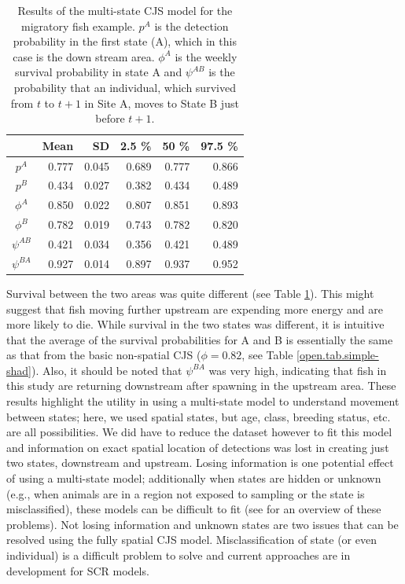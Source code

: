 \begin{table}
\centering
\caption{
  Results of the multi-state CJS model for the migratory fish example.  $p^A$ is the detection probability in the first state (A), which in this case is the down stream area.  $\phi^A$ is the weekly survival probability in state A and $\psi^{AB}$ is the probability that an individual, which survived from $t$ to $t+1$ in Site A, moves to State B just
  before $t+1$.
}
\begin{tabular}{crrrrr}
\hline \hline
&       Mean   &  SD  &  2.5 \%   &   50 \%    &  97.5 \%  \\  \hline
$p^A$ & 0.777 & 0.045 & 0.689  & 0.777  & 0.866 \\
$p^B$  & 0.434  & 0.027 & 0.382 & 0.434  & 0.489 \\
$\phi^A$  & 0.850 & 0.022 & 0.807  & 0.851  & 0.893  \\
$\phi^B$  & 0.782  & 0.019 & 0.743  & 0.782& 0.820  \\
$\psi^{AB}$ & 0.421 & 0.034 & 0.356  & 0.421 &  0.489 \\
$\psi^{BA}$& 0.927 & 0.014 & 0.897  & 0.937 &  0.952  \\
\hline
\end{tabular}
\label{open.tab.multi-shad}
\end{table}

Survival between the two areas was quite different (see Table
\ref{open.tab.multi-shad}).  This might suggest that fish moving
further upstream are expending more energy and are more likely to die.
While survival in the two states was different, it is intuitive that
the average of the survival probabilities for A and B is essentially
the same as that from the basic non-spatial CJS ($\phi = 0.82$, see
Table \ref{open.tab.simple-shad}).  Also, it should be noted that
$\psi^{BA}$ was very high, indicating that fish in this study are
returning downstream after spawning in the upstream area.  These
results highlight the utility in using a multi-state model to
understand movement between states; here, we used spatial states, but
age, class, breeding status, etc. are all possibilities.  We did have
to reduce the  
dataset however to fit this model and information on exact spatial location of detections
was lost in creating just two states, downstream and upstream.  Losing
information is one potential effect of using a multi-state model;
additionally when states are hidden or unknown (e.g., when animals are
in a region not exposed to sampling or the state is misclassified),
these models can be difficult to fit (see \citet{conn_cooch:2009} for
an overview of these problems).  Not losing information and unknown
states are two issues that can be resolved using the fully spatial CJS
model.  Misclassification of state (or even individual) is a difficult
problem to solve and current approaches \citep{link_etal:2010,
  mcclintock_etal:inpress} are in development for SCR models.  



